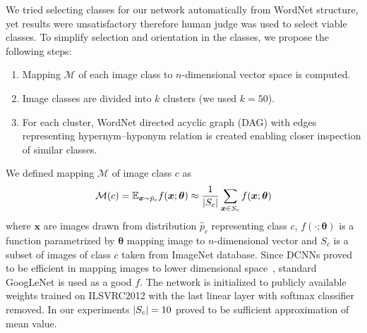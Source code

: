 We tried selecting classes for our network automatically from WordNet structure, yet results were unsatisfactory therefore human judge was used to select viable classes. To simplify selection and orientation in the classes, we propose the following steps:
\begin{enumerate}
	\item Mapping $\mathcal{M}$ of each image class to $n$-dimensional vector space is computed.
	\item Image classes are divided into $k$ clusters (we used $k=50$).
	\item For each cluster, WordNet directed acyclic graph (DAG) with edges representing hypernym--hyponym relation is created enabling closer inspection of similar classes.
\end{enumerate}
We defined mapping $\mathcal{M}$ of image class $c$ as
\begin{equation}
\mathcal{M}(c)=\mathbb{E}_{\bm{x}\sim \hat{p}_{c}}f(\bm{x};\bm{\theta})\approx\frac{1}{\left|{S_c}\right|}\sum_{\bm{x}\in S_c}f(\bm{x};\bm{\theta})
\end{equation}
where $\bm{x}$ are images drawn from distribution $\hat{p}_{c}$ representing class $c$, $f(\cdot;\bm{\theta})$ is a function parametrized by $\bm{\theta}$ mapping image to $n$-dimensional vector and $S_c$ is a subset of images of class $c$ taken from ImageNet database. Since DCNNs proved to be efficient in mapping images to lower dimensional space~\cite{donahue2014decaf}, standard GoogLeNet is used as a good $f$. The network is initialized to publicly available weights \cite{TFmodels} trained on ILSVRC2012 with the last linear layer with softmax classifier removed. In our experiments $\left|{S_c}\right|=10$ proved to be sufficient approximation of mean value.

